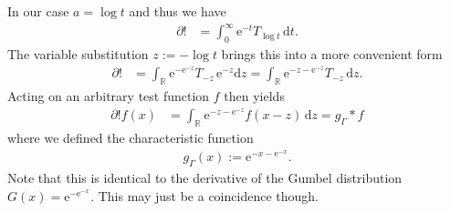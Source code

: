 \documentclass[english, parskip=full]{scrartcl}
\newcommand{\intx}{}
\newcommand{\intr}{}
\newcommand{\e}{\text{e}}
\begin{document}
In our case $a= \log t$ and thus we have
\begin{align}
\partial ! &= \intx\int_{0}^{\infty} \e^{-t} T_{\log t} \, \mathrm{d}t.
\end{align}
The variable substitution $z := -\log t$ brings this into a more convenient form
\begin{align}
\partial ! &= \intr\int_{\mathbb{R}^{ }} \e^{-\e^{-z}} T_{-z} \, \e^{-z} \mathrm{d}z = \intr\int_{\mathbb{R}^{ }} \e^{-z - \e^{-z}} T_{-z} \, \mathrm{d}z.
\end{align}
Acting on an arbitrary test function $f$ then yields
\begin{align}
\partial ! f(x) &= \intr\int_{\mathbb{R}^{ }} \e^{-z - \e^{-z}} f(x - z) \, \mathrm{d}z = g_\Gamma \ast f
\end{align}
where we defined the characteristic function 
\begin{align}
g_\Gamma(x) := \e^{-x - \e^{-x}}.
\end{align}
Note that this is identical to the derivative of the Gumbel distribution $G(x) = \e^{-\e^{-x}}$.
This may just be a coincidence though.
\end{document}
